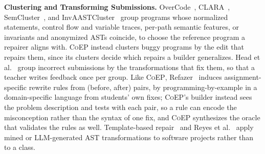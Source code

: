 \documentclass[acmsmall,screen,review,anonymous,nonacm]{acmart}
\newcommand{\tool}{\textsc{CoEP}\xspace}
\begin{document}
\textbf{Clustering and Transforming Submissions.} OverCode~\cite{glassman2015overcode}, CLARA~\cite{gulwani2018automated}, SemCluster~\cite{perry2019semcluster}, and InvAASTCluster~\cite{orvalho2025invaastcluster} group programs whose normalized statements, control flow and variable traces, per-path semantic features, or invariants and anonymized ASTs coincide, to choose the reference program a repairer aligns with. \tool instead clusters buggy programs by the edit that repairs them, since its clusters decide which repairs a builder generalizes. Head et al.~\cite{head2017writing} group incorrect submissions by the transformations that fix them, so that a teacher writes feedback once per group. Like \tool, Refazer~\cite{rolim2017learning} induces assignment-specific rewrite rules from (before, after) pairs, by programming-by-example in a domain-specific language from students' own fixes; \tool's builder instead sees the problem description and tests with each pair, so a rule can encode the misconception rather than the syntax of one fix, and \tool synthesizes the oracle that validates the rules as well. Template-based repair~\cite{kim2013automatic,liu2019tbar} and Reyes et al.~\cite{reyes2026agentic} apply mined or LLM-generated AST transformations to software projects rather than to a class.
\end{document}
